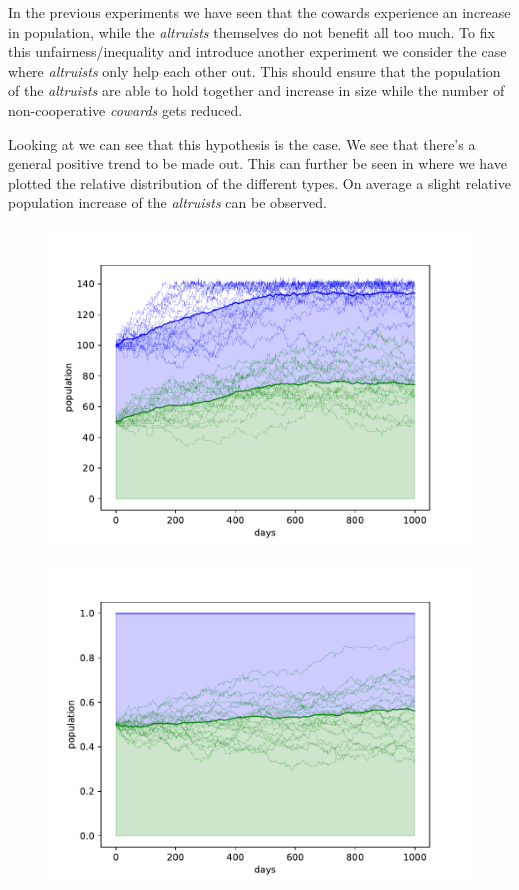 \documentclass[sigconf]{acmart}
\newcommand{\todo}[1]{{\color{red}{#1}}}
\newcommand{\cowards}{\textit{cowards}\xspace}
\newcommand{\altruists}{\textit{altruists}\xspace}
\begin{document}
    In the previous experiments we have seen that the cowards experience an increase in population, while the \altruists themselves do not benefit all too much.
    To fix this unfairness/inequality and introduce another experiment we consider the case where \altruists only help each other out.
    This should ensure that the population of the \altruists are able to hold together and increase in size while the number of non-cooperative \cowards gets reduced.

    Looking at  we can see that this hypothesis is the case.
    We see that there's a general positive trend to be made out.
    This can further be seen in  where we have plotted the relative distribution of the different types.
    On average a slight relative population increase of the \altruists can be observed.




    \begin{figure}
        \includegraphics[width=\columnwidth]{figures/alt_ego}
        \caption{\todo{}}
        \label{fig:alt_ego}
    \end{figure}


    \begin{figure}
        \includegraphics[width=\columnwidth]{figures/alt_ego_rel}
        \caption{\todo{}}
        \label{fig:alt_ego_rel}
    \end{figure}
\end{document}

